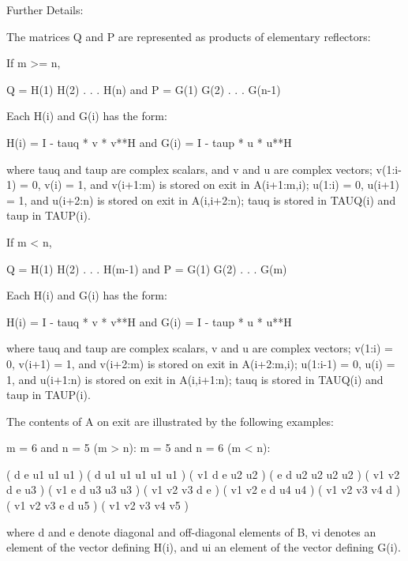 \begin{DoxyParagraph}{Further Details\+: }
\begin{DoxyVerb}  The matrices Q and P are represented as products of elementary
  reflectors:

  If m >= n,

     Q = H(1) H(2) . . . H(n)  and  P = G(1) G(2) . . . G(n-1)

  Each H(i) and G(i) has the form:

     H(i) = I - tauq * v * v**H  and G(i) = I - taup * u * u**H

  where tauq and taup are complex scalars, and v and u are complex
  vectors; v(1:i-1) = 0, v(i) = 1, and v(i+1:m) is stored on exit in
  A(i+1:m,i); u(1:i) = 0, u(i+1) = 1, and u(i+2:n) is stored on exit in
  A(i,i+2:n); tauq is stored in TAUQ(i) and taup in TAUP(i).

  If m < n,

     Q = H(1) H(2) . . . H(m-1)  and  P = G(1) G(2) . . . G(m)

  Each H(i) and G(i) has the form:

     H(i) = I - tauq * v * v**H  and G(i) = I - taup * u * u**H

  where tauq and taup are complex scalars, v and u are complex vectors;
  v(1:i) = 0, v(i+1) = 1, and v(i+2:m) is stored on exit in A(i+2:m,i);
  u(1:i-1) = 0, u(i) = 1, and u(i+1:n) is stored on exit in A(i,i+1:n);
  tauq is stored in TAUQ(i) and taup in TAUP(i).

  The contents of A on exit are illustrated by the following examples:

  m = 6 and n = 5 (m > n):          m = 5 and n = 6 (m < n):

    (  d   e   u1  u1  u1 )           (  d   u1  u1  u1  u1  u1 )
    (  v1  d   e   u2  u2 )           (  e   d   u2  u2  u2  u2 )
    (  v1  v2  d   e   u3 )           (  v1  e   d   u3  u3  u3 )
    (  v1  v2  v3  d   e  )           (  v1  v2  e   d   u4  u4 )
    (  v1  v2  v3  v4  d  )           (  v1  v2  v3  e   d   u5 )
    (  v1  v2  v3  v4  v5 )

  where d and e denote diagonal and off-diagonal elements of B, vi
  denotes an element of the vector defining H(i), and ui an element of
  the vector defining G(i).\end{DoxyVerb}
 
\end{DoxyParagraph}
\hypertarget{group__complex16GEcomputational_gad12a48a5c74ecf1697170d85d71d7e96}{}

